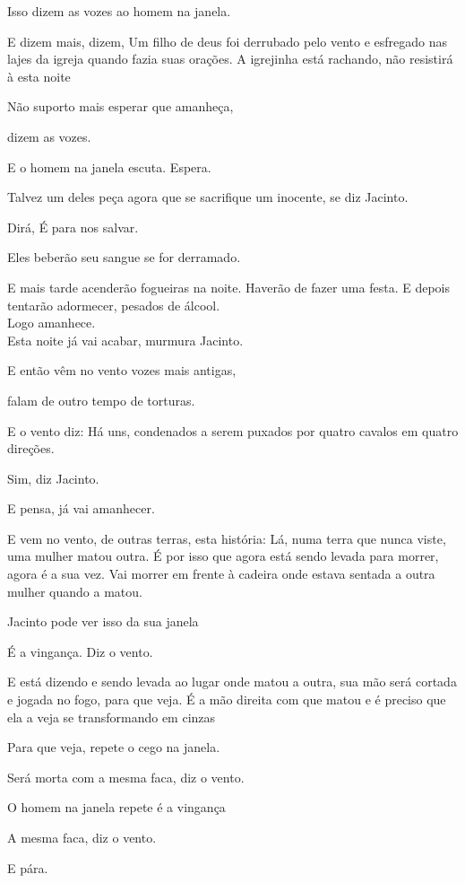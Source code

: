 Isso dizem as vozes ao homem na janela.

E dizem mais, dizem, Um filho de deus foi derrubado pelo vento e
esfregado nas lajes da igreja quando fazia suas orações. A igrejinha
está rachando, não resistirá à esta noite

Não suporto mais esperar que amanheça,

dizem as vozes.

E o homem na janela escuta. Espera.

Talvez um deles peça agora que se sacrifique um inocente, se diz
Jacinto.

Dirá, É para nos salvar.

Eles beberão seu sangue se for derramado.

E mais tarde acenderão fogueiras na noite. Haverão de fazer uma festa. E
depois tentarão adormecer, pesados de álcool.\\

Logo amanhece.\\

Esta noite já vai acabar, murmura Jacinto.

E então vêm no vento vozes mais antigas,

falam de outro tempo de torturas.

E o vento diz: Há uns, condenados a serem puxados por quatro cavalos em
quatro direções.

Sim, diz Jacinto.

E pensa, já vai amanhecer.

E vem no vento, de outras terras, esta história: Lá, numa terra que
nunca viste, uma mulher matou outra. É por isso que agora está sendo
levada para morrer, agora é a sua vez. Vai morrer em frente à cadeira
onde estava sentada a outra mulher quando a matou.

Jacinto pode ver isso da sua janela

É a vingança. Diz o vento.

E está dizendo e sendo levada ao lugar onde matou a outra, sua mão será
cortada e jogada no fogo, para que veja. É a mão direita com que matou e
é preciso que ela a veja se transformando em cinzas

Para que veja, repete o cego na janela.

Será morta com a mesma faca, diz o vento.

O homem na janela repete é a vingança

A mesma faca, diz o vento.

E pára.\\

